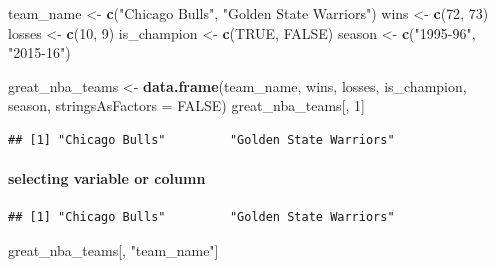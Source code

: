 \documentclass[
]{book}
\newenvironment{Shaded}{\begin{snugshade}}{\end{snugshade}}
\newcommand{\AttributeTok}[1]{\textcolor[rgb]{0.13,0.29,0.53}{#1}}
\newcommand{\ConstantTok}[1]{\textcolor[rgb]{0.56,0.35,0.01}{#1}}
\newcommand{\DecValTok}[1]{\textcolor[rgb]{0.00,0.00,0.81}{#1}}
\newcommand{\FunctionTok}[1]{\textcolor[rgb]{0.13,0.29,0.53}{\textbf{#1}}}
\newcommand{\NormalTok}[1]{#1}
\newcommand{\OtherTok}[1]{\textcolor[rgb]{0.56,0.35,0.01}{#1}}
\newcommand{\SpecialCharTok}[1]{\textcolor[rgb]{0.81,0.36,0.00}{\textbf{#1}}}
\newcommand{\StringTok}[1]{\textcolor[rgb]{0.31,0.60,0.02}{#1}}
\theoremstyle{definition}
\theoremstyle{definition}
\theoremstyle{definition}
\theoremstyle{definition}
\theoremstyle{remark}
\begin{document}
\begin{Shaded}
\begin{Highlighting}[]
\NormalTok{team\_name }\OtherTok{\textless{}{-}} \FunctionTok{c}\NormalTok{(}\StringTok{"Chicago Bulls"}\NormalTok{, }\StringTok{"Golden State Warriors"}\NormalTok{)}
\NormalTok{wins }\OtherTok{\textless{}{-}} \FunctionTok{c}\NormalTok{(}\DecValTok{72}\NormalTok{, }\DecValTok{73}\NormalTok{)}
\NormalTok{losses }\OtherTok{\textless{}{-}} \FunctionTok{c}\NormalTok{(}\DecValTok{10}\NormalTok{, }\DecValTok{9}\NormalTok{)}
\NormalTok{is\_champion }\OtherTok{\textless{}{-}} \FunctionTok{c}\NormalTok{(}\ConstantTok{TRUE}\NormalTok{, }\ConstantTok{FALSE}\NormalTok{)}
\NormalTok{season }\OtherTok{\textless{}{-}} \FunctionTok{c}\NormalTok{(}\StringTok{"1995{-}96"}\NormalTok{, }\StringTok{"2015{-}16"}\NormalTok{)}
 
\NormalTok{great\_nba\_teams }\OtherTok{\textless{}{-}} \FunctionTok{data.frame}\NormalTok{(team\_name, wins, losses, is\_champion, season, }\AttributeTok{stringsAsFactors =} \ConstantTok{FALSE}\NormalTok{)}
\NormalTok{great\_nba\_teams[, }\DecValTok{1}\NormalTok{]}
\end{Highlighting}
\end{Shaded}

\begin{verbatim}
## [1] "Chicago Bulls"         "Golden State Warriors"
\end{verbatim}

\hypertarget{selecting-variable-or-column}{%
\paragraph{selecting variable or column}\label{selecting-variable-or-column}}

\begin{Shaded}
\end{Shaded}

\begin{verbatim}
## [1] "Chicago Bulls"         "Golden State Warriors"
\end{verbatim}

\begin{Shaded}
\begin{Highlighting}[]
\NormalTok{great\_nba\_teams[, }\StringTok{"team\_name"}\NormalTok{]}
\end{Highlighting}
\end{Shaded}
\end{document}
